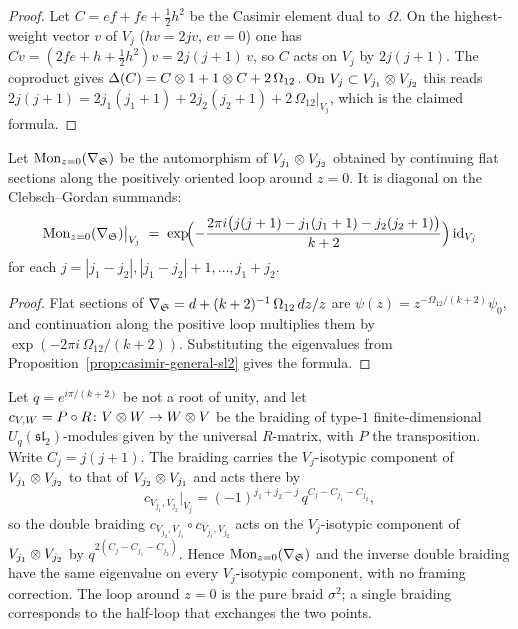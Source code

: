 \begin{proof}
Let $C = ef + fe + \tfrac{1}{2}h^2$ be the Casimir element dual to~$\Omega$. On the highest-weight vector $v$ of $V_j$ ($hv = 2jv$, $ev = 0$) one has $Cv = (2fe + h + \tfrac{1}{2}h^2)v = 2j(j+1)\,v$, so $C$ acts on $V_j$ by $2j(j+1)$. The coproduct gives $\Delta(C) = C \otimes 1 + 1 \otimes C + 2\,\Omega_{12}$. On $V_j \subset V_{j_1} \otimes V_{j_2}$ this reads $2j(j+1) = 2j_1(j_1+1) + 2j_2(j_2+1) + 2\,\Omega_{12}|_{V_j}$, which is the claimed formula.
\end{proof}

\begin{theorem}
\label{thm:monodromy-eigenvalues-sl2}
Let $\mathrm{Mon}_{z=0}(\nabla_{\mathfrak{S}})$ be the automorphism of $V_{j_1} \otimes V_{j_2}$ obtained by continuing flat sections along the positively oriented loop around $z = 0$. It is diagonal on the Clebsch--Gordan summands:
\[
 \mathrm{Mon}_{z=0}(\nabla_{\mathfrak{S}})\big|_{V_j}
 \;=\;
 \exp\!\Bigl(-\frac{2\pi i\bigl(j(j+1) - j_1(j_1+1) - j_2(j_2+1)\bigr)}{k+2}\Bigr)\,\mathrm{id}_{V_j}
\]
for each $j = |j_1 - j_2|, |j_1 - j_2| + 1, \dots, j_1 + j_2$.
\end{theorem}

\begin{proof}
Flat sections of $\nabla_{\mathfrak{S}} = d + (k+2)^{-1}\,\Omega_{12}\,dz/z$ are $\psi(z) = z^{-\Omega_{12}/(k+2)}\psi_0$, and continuation along the positive loop multiplies them by $\exp(-2\pi i\,\Omega_{12}/(k+2))$. Substituting the eigenvalues from Proposition~\ref{prop:casimir-general-sl2} gives the formula.
\end{proof}

\begin{corollary}
\label{cor:agreement-qgroup-sl2}
Let $q = e^{i\pi/(k+2)}$ be not a root of unity, and let $c_{V,W} = P \circ R\colon V \otimes W \to W \otimes V$ be the braiding of type-$1$ finite-dimensional $U_q(\mathfrak{sl}_2)$-modules given by the universal $R$-matrix, with $P$ the transposition. Write $C_j = j(j+1)$. The braiding carries the $V_j$-isotypic component of $V_{j_1} \otimes V_{j_2}$ to that of $V_{j_2} \otimes V_{j_1}$ and acts there by
\[
 c_{V_{j_1},V_{j_2}}\big|_{V_j} = (-1)^{j_1+j_2-j}\,q^{C_j - C_{j_1} - C_{j_2}},
\]
so the double braiding $c_{V_{j_2},V_{j_1}} \circ c_{V_{j_1},V_{j_2}}$ acts on the $V_j$-isotypic component of $V_{j_1} \otimes V_{j_2}$ by $q^{2(C_j - C_{j_1} - C_{j_2})}$. Hence $\mathrm{Mon}_{z=0}(\nabla_{\mathfrak{S}})$ and the inverse double braiding have the same eigenvalue on every $V_j$-isotypic component, with no framing correction. The loop around $z = 0$ is the pure braid $\sigma^2$; a single braiding corresponds to the half-loop that exchanges the two points.
\end{corollary}

